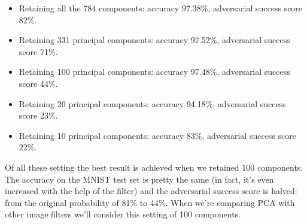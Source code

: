 \begin{itemize}
  \item Retaining all the 784 components: accuracy 97.38\%, adversarial
    success score 82\%.
  \item Retaining 331 principal components: accuracy 97.52\%,
    adversarial success score 71\%.
  \item Retaining 100 principal components: accuracy 97.48\%,
    adversarial success score 44\%.
  \item Retaining 20 principal components: accuracy 94.18\%,
    adversarial success score 23\%.
  \item Retaining 10 principal components: accuracy 83\%, adversarial
    success score 22\%.
\end{itemize}

Of all these setting the best result is achieved when we retained 100
components. The accuracy on the MNIST test set is pretty the same (in
fact, it's even increased with the help of the filter) and the
adversarial success score is halved: from the original probability of
81\% to 44\%. When we're comparing PCA with other image filters we'll
consider this setting of 100 components.
